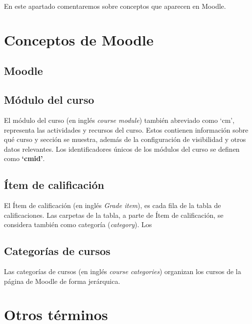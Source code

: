 
En este apartado comentaremos sobre conceptos que aparecen en Moodle.



\section{Conceptos de Moodle}
\subsection{Moodle}



\subsection{Módulo del curso}
El módulo del curso\cite{noauthor_course_nodate} (en inglés \textit{course module}) también abreviado como `cm', representa las actividades y recursos del curso. Estos contienen información sobre qué curso y sección se muestra, además de la configuración de visibilidad y otros datos relevantes. Los identificadores únicos de los módulos del curso se definen como \textbf{`cmid'}. 

\subsection{Ítem de calificación}
El Ítem de calificación\cite{noauthor_grade_nodate} (en inglés \textit{Grade item}), es cada fila de la tabla de calificaciones.
Las carpetas de la tabla, a parte de Ítem de calificación, se considera también como categoría (\textit{category}).
Los


\subsection{Categorías de cursos}
Las categorías de cursos\cite{noauthor_course_nodate-1} (en inglés \textit{course categories}) organizan los cursos de la página de Moodle de forma jerárquica.


\section{Otros términos}
